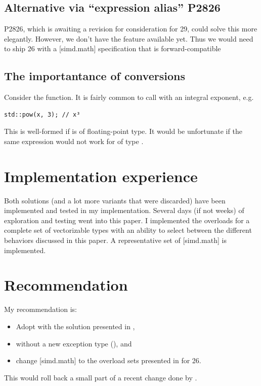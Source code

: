 \subsection{Alternative via “expression alias” P2826}

P2826, which is awaiting a revision for consideration for \CC{}29, could solve this more elegantly.
However, we don't have the feature available yet.
Thus we would need to ship \CC{}26 with a [simd.math] specification that is forward-compatible 

\subsection{The importantance of conversions}

Consider the  function.
It is fairly common to call  with an integral exponent, e.g.
\medskip\begin{lstlisting}[style=Vc]
std::pow(x, 3); // x³
\end{lstlisting}
This is well-formed if  is of floating-point type.
It would be unfortunate if the same expression would not work for  of type
.


\section{Implementation experience}
Both solutions (and a lot more variants that were discarded) have been implemented and tested in my
implementation.
Several days (if not weeks) of exploration and testing went into this paper.
I implemented the  overloads for a complete set of vectorizable types with an
ability to select between the different behaviors discussed in this paper.
A representative set of [simd.math] is implemented.


\section{Recommendation}

My recommendation is:
\begin{itemize}
  \item Adopt with the solution presented in ,
  \item without a new exception type (), and
  \item change [simd.math] to the overload sets presented in  for \CC{}26.
\end{itemize}
This would roll back a small part of a recent change done by \cite{P3430R3}.

